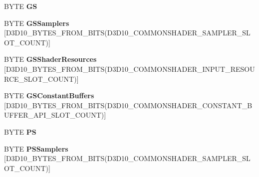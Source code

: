 \begin{DoxyCompactItemize}
\mbox{\label{struct___d3_d10___s_t_a_t_e___b_l_o_c_k___m_a_s_k_ad72b9f7227a0a823026347d2f25a897d}} 
B\+Y\+TE {\bfseries GS}
\item 
\mbox{\label{struct___d3_d10___s_t_a_t_e___b_l_o_c_k___m_a_s_k_a98c28af6004da2121c5c4fa63dcd6d9a}} 
B\+Y\+TE {\bfseries G\+S\+Samplers} \mbox{[}D3\+D10\+\_\+\+B\+Y\+T\+E\+S\+\_\+\+F\+R\+O\+M\+\_\+\+B\+I\+TS(D3\+D10\+\_\+\+C\+O\+M\+M\+O\+N\+S\+H\+A\+D\+E\+R\+\_\+\+S\+A\+M\+P\+L\+E\+R\+\_\+\+S\+L\+O\+T\+\_\+\+C\+O\+U\+NT)\mbox{]}
\item 
\mbox{\label{struct___d3_d10___s_t_a_t_e___b_l_o_c_k___m_a_s_k_a7d6861b2a5073d5cdc13bed5c360cc7a}} 
B\+Y\+TE {\bfseries G\+S\+Shader\+Resources} \mbox{[}D3\+D10\+\_\+\+B\+Y\+T\+E\+S\+\_\+\+F\+R\+O\+M\+\_\+\+B\+I\+TS(D3\+D10\+\_\+\+C\+O\+M\+M\+O\+N\+S\+H\+A\+D\+E\+R\+\_\+\+I\+N\+P\+U\+T\+\_\+\+R\+E\+S\+O\+U\+R\+C\+E\+\_\+\+S\+L\+O\+T\+\_\+\+C\+O\+U\+NT)\mbox{]}
\item 
\mbox{\label{struct___d3_d10___s_t_a_t_e___b_l_o_c_k___m_a_s_k_a5973ecc717c4c817ea60475eedec1146}} 
B\+Y\+TE {\bfseries G\+S\+Constant\+Buffers} \mbox{[}D3\+D10\+\_\+\+B\+Y\+T\+E\+S\+\_\+\+F\+R\+O\+M\+\_\+\+B\+I\+TS(D3\+D10\+\_\+\+C\+O\+M\+M\+O\+N\+S\+H\+A\+D\+E\+R\+\_\+\+C\+O\+N\+S\+T\+A\+N\+T\+\_\+\+B\+U\+F\+F\+E\+R\+\_\+\+A\+P\+I\+\_\+\+S\+L\+O\+T\+\_\+\+C\+O\+U\+NT)\mbox{]}
\item 
\mbox{\label{struct___d3_d10___s_t_a_t_e___b_l_o_c_k___m_a_s_k_a0089eb9c2550f8794622e631ba048f66}} 
B\+Y\+TE {\bfseries PS}
\item 
\mbox{\label{struct___d3_d10___s_t_a_t_e___b_l_o_c_k___m_a_s_k_ad940735fec16d7cbdf2b5420d6e610fc}} 
B\+Y\+TE {\bfseries P\+S\+Samplers} \mbox{[}D3\+D10\+\_\+\+B\+Y\+T\+E\+S\+\_\+\+F\+R\+O\+M\+\_\+\+B\+I\+TS(D3\+D10\+\_\+\+C\+O\+M\+M\+O\+N\+S\+H\+A\+D\+E\+R\+\_\+\+S\+A\+M\+P\+L\+E\+R\+\_\+\+S\+L\+O\+T\+\_\+\+C\+O\+U\+NT)\mbox{]}
\item 
\mbox{\label{struct___d3_d10___s_t_a_t_e___b_l_o_c_k___m_a_s_k_a0879e0a0021c8c511488e063a88737af}} 

\end{DoxyCompactItemize}
